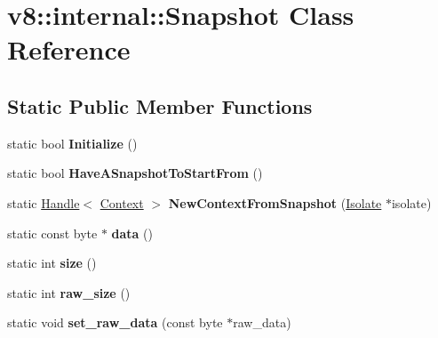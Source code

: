 \hypertarget{classv8_1_1internal_1_1_snapshot}{}\section{v8\+:\+:internal\+:\+:Snapshot Class Reference}
\label{classv8_1_1internal_1_1_snapshot}
\subsection*{Static Public Member Functions}
\begin{DoxyCompactItemize}
\item 
\hypertarget{classv8_1_1internal_1_1_snapshot_a1bf31d8c55ea52e2c8676b7d74c56cdc}{}static bool {\bfseries Initialize} ()\label{classv8_1_1internal_1_1_snapshot_a1bf31d8c55ea52e2c8676b7d74c56cdc}

\item 
\hypertarget{classv8_1_1internal_1_1_snapshot_a7b0e34f91c8947c310c5d2b5781deb58}{}static bool {\bfseries Have\+A\+Snapshot\+To\+Start\+From} ()\label{classv8_1_1internal_1_1_snapshot_a7b0e34f91c8947c310c5d2b5781deb58}

\item 
\hypertarget{classv8_1_1internal_1_1_snapshot_a0e3d2a308a313ba6ae526b9e6e42e620}{}static \hyperlink{classv8_1_1internal_1_1_handle}{Handle}$<$ \hyperlink{classv8_1_1internal_1_1_context}{Context} $>$ {\bfseries New\+Context\+From\+Snapshot} (\hyperlink{classv8_1_1internal_1_1_isolate}{Isolate} $\ast$isolate)\label{classv8_1_1internal_1_1_snapshot_a0e3d2a308a313ba6ae526b9e6e42e620}

\item 
\hypertarget{classv8_1_1internal_1_1_snapshot_adb088a2cba328c1b465b41a5fb5e1895}{}static const byte $\ast$ {\bfseries data} ()\label{classv8_1_1internal_1_1_snapshot_adb088a2cba328c1b465b41a5fb5e1895}

\item 
\hypertarget{classv8_1_1internal_1_1_snapshot_a1dd6c15ae16767788d924102ab5357b3}{}static int {\bfseries size} ()\label{classv8_1_1internal_1_1_snapshot_a1dd6c15ae16767788d924102ab5357b3}

\item 
\hypertarget{classv8_1_1internal_1_1_snapshot_a676d28827fccd733ada13336396dbbc8}{}static int {\bfseries raw\+\_\+size} ()\label{classv8_1_1internal_1_1_snapshot_a676d28827fccd733ada13336396dbbc8}

\item 
\hypertarget{classv8_1_1internal_1_1_snapshot_aa6c1da10d33670c4e3d81bc7aae0885b}{}static void {\bfseries set\+\_\+raw\+\_\+data} (const byte $\ast$raw\+\_\+data)\label{classv8_1_1internal_1_1_snapshot_aa6c1da10d33670c4e3d81bc7aae0885b}


\end{DoxyCompactItemize}
